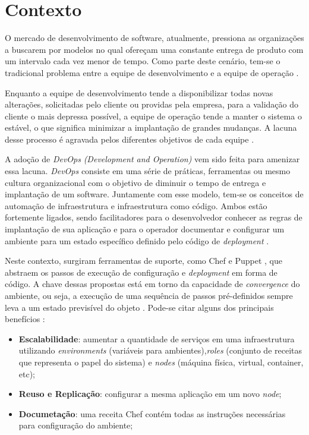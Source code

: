 \section{Contexto}
\label{sec:contexto}

O mercado de desenvolvimento de software, atualmente, pressiona as organizações
a buscarem por modelos no qual ofereçam uma constante entrega de produto com
um intervalo cada vez menor de tempo. Como parte deste cenário, tem-se o
tradicional problema entre a equipe de desenvolvimento e a equipe de operação
\cite{hummer:2013}.

Enquanto a equipe de desenvolvimento tende a disponibilizar todas novas alterações,
solicitadas pelo cliente ou providas pela empresa, para a validação do cliente o
mais depressa possível, a equipe de operação tende a manter o sistema o estável,
o que significa minimizar a implantação de grandes mudanças. A lacuna desse
processo é agravada pelos diferentes objetivos de cada equipe
\cite{huttermann:2012}.

A adoção de \textit{DevOps} \textit{(Development and Operation)} vem sido feita
para amenizar essa lacuna. \textit{DevOps} consiste em uma série de práticas,
ferramentas ou mesmo cultura organizacional com o objetivo de diminuir o tempo
de entrega e implantação de um software. Juntamente com esse modelo,
tem-se os conceitos de automação de infraestrutura e infraestrutura
como código. Ambos estão fortemente ligados, sendo facilitadores para o
desenvolvedor conhecer as regras de implantação de sua aplicação
e para o operador documentar e configurar um ambiente para um estado específico
definido pelo código de \textit{deployment} \cite{hummer:2013}.

Neste contexto, surgiram ferramentas de suporte, como Chef \cite{chef:2016} e
Puppet \cite{puppet:2016}, que abstraem os passos de execução de configuração
e \textit{deployment} em forma de código. A chave dessas propostas está em torno
da capacidade de \textit{convergence} do ambiente, ou seja, a execução de uma
sequência de passos pré-definidos sempre leva a um estado previsível do objeto
\cite{hummer:2013}. Pode-se citar alguns dos principais benefícios
\cite{vasiliev:2014}:

\begin{itemize}
  \item \textbf{Escalabilidade}: aumentar a quantidade de serviços em uma infraestrutura
    utilizando \textit{environments} (variáveis para ambientes),\textit{roles}
    (conjunto de receitas que representa o papel do sistema) e \textit{nodes}
    (máquina física, virtual, container, etc);
  \item \textbf{Reuso e Replicação}: configurar a mesma aplicação em um novo \textit{node};
  \item \textbf{Documetação}: uma receita Chef contém todas as instruções necessárias
    para configuração do ambiente;
\end{itemize}

